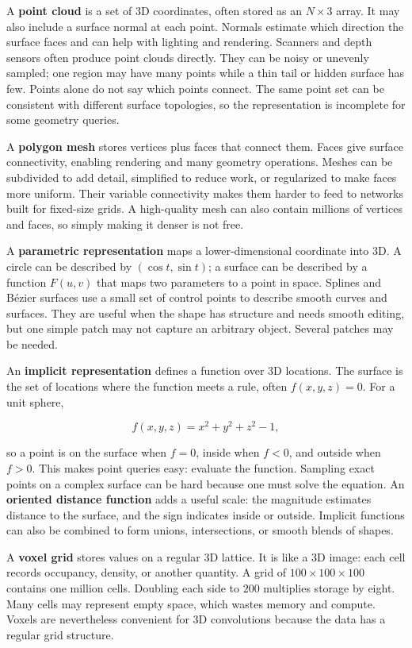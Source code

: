 A \textbf{point cloud} is a set of 3D coordinates, often stored as an \(N\times3\) array. It may also include a surface normal at each point. Normals estimate which direction the surface faces and can help with lighting and rendering. Scanners and depth sensors often produce point clouds directly. They can be noisy or unevenly sampled; one region may have many points while a thin tail or hidden surface has few. Points alone do not say which points connect. The same point set can be consistent with different surface topologies, so the representation is incomplete for some geometry queries.

A \textbf{polygon mesh} stores vertices plus faces that connect them. Faces give surface connectivity, enabling rendering and many geometry operations. Meshes can be subdivided to add detail, simplified to reduce work, or regularized to make faces more uniform. Their variable connectivity makes them harder to feed to networks built for fixed-size grids. A high-quality mesh can also contain millions of vertices and faces, so simply making it denser is not free.

A \textbf{parametric representation} maps a lower-dimensional coordinate into 3D. A circle can be described by \((\cos t,\sin t)\); a surface can be described by a function \(F(u,v)\) that maps two parameters to a point in space. Splines and Bézier surfaces use a small set of control points to describe smooth curves and surfaces. They are useful when the shape has structure and needs smooth editing, but one simple patch may not capture an arbitrary object. Several patches may be needed.

An \textbf{implicit representation} defines a function over 3D locations. The surface is the set of locations where the function meets a rule, often \(f(x,y,z)=0\). For a unit sphere,

\[
f(x,y,z)=x^2+y^2+z^2-1,
\]

so a point is on the surface when \(f=0\), inside when \(f<0\), and outside when \(f>0\). This makes point queries easy: evaluate the function. Sampling exact points on a complex surface can be hard because one must solve the equation. An \textbf{oriented distance function} adds a useful scale: the magnitude estimates distance to the surface, and the sign indicates inside or outside. Implicit functions can also be combined to form unions, intersections, or smooth blends of shapes.

A \textbf{voxel grid} stores values on a regular 3D lattice. It is like a 3D image: each cell records occupancy, density, or another quantity. A grid of \(100\times100\times100\) contains one million cells. Doubling each side to \(200\) multiplies storage by eight. Many cells may represent empty space, which wastes memory and compute. Voxels are nevertheless convenient for 3D convolutions because the data has a regular grid structure.

